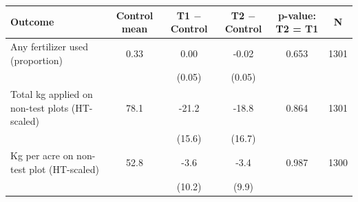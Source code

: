 {
\def\sym#1{\ifmmode^{#1}\else\(^{#1}\)\fi}
\begin{tabular}{lccccc}
\hline\hline
Outcome & Control mean & T1 $-$ Control & T2 $-$ Control & p-value: T2 = T1 & N \\
\hline
Any fertilizer used (proportion) & 0.33 & 0.00 & -0.02 & 0.653 & 1301 \\
& & (0.05) & (0.05) & & \\
Total kg applied on non-test plots (HT-scaled) & 78.1 & -21.2 & -18.8 & 0.864 & 1301 \\
& & (15.6) & (16.7) & & \\
Kg per acre on non-test plot (HT-scaled) & 52.8 & -3.6 & -3.4 & 0.987 & 1300 \\
& & (10.2) & (9.9) & & \\
\hline\hline
\end{tabular}
}
